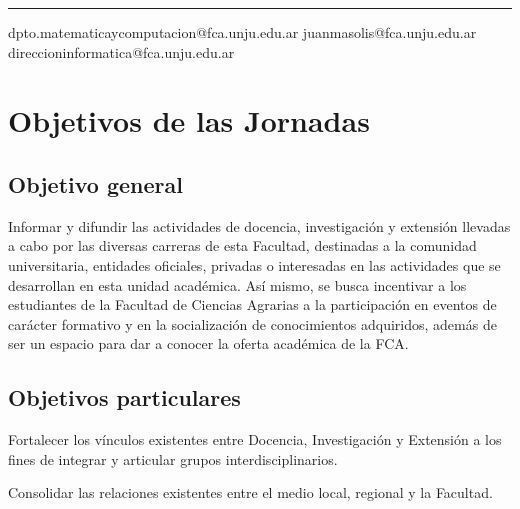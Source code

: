 \documentclass[
  spanish,
  letterpaper,
  DIV=11,
  numbers=noendperiod]{scrreprt}
\begin{document}
\begin{center}\rule{0.5\linewidth}{0.5pt}\end{center}

\begin{tcolorbox}[enhanced jigsaw, arc=.35mm, colframe=quarto-callout-note-color-frame, opacityback=0, leftrule=.75mm, titlerule=0mm, colbacktitle=quarto-callout-note-color!10!white, breakable, bottomrule=.15mm, colback=white, bottomtitle=1mm, toptitle=1mm, coltitle=black, title={Por consultas y comentarios sobre la página de pósteres}, left=2mm, opacitybacktitle=0.6, toprule=.15mm, rightrule=.15mm]

dpto.matematicaycomputacion@fca.unju.edu.ar \textbar{}
juanmasolis@fca.unju.edu.ar \textbar{}
direccioninformatica@fca.unju.edu.ar

\end{tcolorbox}


\chapter{Objetivos de las Jornadas}\label{objetivos-de-las-jornadas}

\section{Objetivo general}\label{objetivo-general}

Informar y difundir las actividades de docencia, investigación y
extensión llevadas a cabo por las diversas carreras de esta Facultad,
destinadas a la comunidad universitaria, entidades oficiales, privadas o
interesadas en las actividades que se desarrollan en esta unidad
académica. Así mismo, se busca incentivar a los estudiantes de la
Facultad de Ciencias Agrarias a la participación en eventos de carácter
formativo y en la socialización de conocimientos adquiridos, además de
ser un espacio para dar a conocer la oferta académica de la FCA.

\section{Objetivos particulares}\label{objetivos-particulares}

Fortalecer los vínculos existentes entre Docencia, Investigación y
Extensión a los fines de integrar y articular grupos
interdisciplinarios.

Consolidar las relaciones existentes entre el medio local, regional y la
Facultad.
\end{document}
